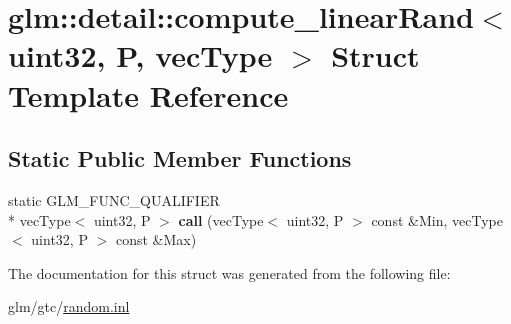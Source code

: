 \hypertarget{structglm_1_1detail_1_1compute__linearRand_3_01uint32_00_01P_00_01vecType_01_4}{\section{glm\-:\-:detail\-:\-:compute\-\_\-linear\-Rand$<$ uint32, P, vec\-Type $>$ Struct Template Reference}
\label{structglm_1_1detail_1_1compute__linearRand_3_01uint32_00_01P_00_01vecType_01_4}
}
\subsection*{Static Public Member Functions}
\begin{DoxyCompactItemize}
\item 
\hypertarget{structglm_1_1detail_1_1compute__linearRand_3_01uint32_00_01P_00_01vecType_01_4_a94f867cad88b72c723b91fb0f8e7e866}{static G\-L\-M\-\_\-\-F\-U\-N\-C\-\_\-\-Q\-U\-A\-L\-I\-F\-I\-E\-R \\*
vec\-Type$<$ uint32, P $>$ {\bfseries call} (vec\-Type$<$ uint32, P $>$ const \&Min, vec\-Type$<$ uint32, P $>$ const \&Max)}\label{structglm_1_1detail_1_1compute__linearRand_3_01uint32_00_01P_00_01vecType_01_4_a94f867cad88b72c723b91fb0f8e7e866}

\end{DoxyCompactItemize}


The documentation for this struct was generated from the following file\-:\begin{DoxyCompactItemize}
\item 
glm/gtc/\hyperlink{random_8inl}{random.\-inl}\end{DoxyCompactItemize}
